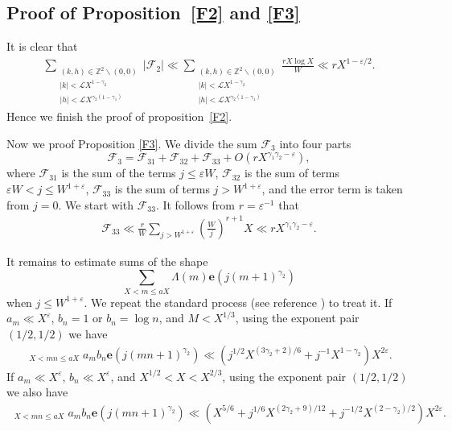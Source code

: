 \documentclass[12pt, reqno, twoside, letterpaper]{amsart}
\numberwithin{equation}{section}
\newcommand{\cF}{\ensuremath{\mathcal{F}}}
\newcommand{\cL}{\ensuremath{\mathcal{L}}}
\newcommand{\ZZ}{\ensuremath{\mathbb{Z}}}
\theoremstyle{customthm}
\theoremstyle{customrem}
\begin{document}
\subsection{Proof of Proposition~\ref{F2} and \ref{F3}}

It is clear that
\begin{align}\label{eq: bound for F2}
	\sum_{\substack{(k,h) \in \ZZ^2 \backslash (0,0) \\ |k|<\cL X^{1-\gamma_2} \\ |h|<\cL X^{\gamma_2(1-\gamma_1)}}}|\cF_2|
	\ll \sum_{\substack{(k,h) \in \ZZ^2 \backslash (0,0) \\ |k|<\cL X^{1-\gamma_2} \\ |h|<\cL X^{\gamma_2(1-\gamma_1)}}}\frac{rX\log X}{W}\ll rX^{1-\varepsilon/2}.
\end{align}
Hence we finish the proof of proposition~\ref{F2}.

Now we proof Proposition \ref{F3}. We divide the sum $\cF_3$ into four parts
$$
\cF_3=\cF_{31}+\cF_{32}+\cF_{33}+O\left(rX^{\gamma_1\gamma_2-\varepsilon}\right),
$$
where $\cF_{31}$ is the sum of the terms $j\leqslant \varepsilon W$, $\cF_{32}$
is the sum of terms $\varepsilon W<j\leqslant W^{1+\varepsilon}$, $\cF_{33}$ is the
sum of terms $j>W^{1+\varepsilon}$, and the error term is taken from $j=0$. We start with
$\cF_{33}$. It follows from $r=\varepsilon^{-1}$ that
\begin{align*}
\cF_{33}\ll \frac{r}{W}\sum_{j>W^{1+\varepsilon}}\left(\frac{W}{j}\right)^{r+1}X
\ll r X^{\gamma_1\gamma_2-\varepsilon}.
\end{align*}

It remains to estimate sums of the shape
$$
\sum_{X < m \leqslant aX}\Lambda(m)\mathbf{e}\left(j(m+1)^{\gamma_2}\right)
$$
when $j\leqslant W^{1+\varepsilon}$.
We repeat the standard process (see reference \cite[P.46-52]{GrahamK1991}) to treat it.
If $a_m\ll X^{\varepsilon}$, $b_n=1$ or $b_n=\log n$, and $M<X^{1/3}$,
using the exponent pair $(1/2,1/2)$ we have
\begin{align*}
\mathop{\sum_{m\sim M}\sum_{n\sim N}
}_{X < mn \leqslant aX}a_mb_n\mathbf{e}\left(j(mn+1)^{\gamma_2}\right)
\ll \left(j^{1/2}X^{(3\gamma_2+2)/6}+j^{-1}X^{1-\gamma_2}\right)X^{2\varepsilon}.
\end{align*}
If $a_m\ll X^{\varepsilon}$, $b_n\ll X^{\varepsilon}$, and $X^{1/2}<X<X^{2/3}$,
using the exponent pair $(1/2,1/2)$ we also have
\begin{align*}
\mathop{\sum_{m\sim M}\sum_{n\sim N}
}_{X < mn \leqslant aX}a_mb_n\mathbf{e}\left(j(mn+1)^{\gamma_2}\right)
\ll \left(X^{5/6}+j^{1/6}X^{(2\gamma_2+9)/12}
+j^{-1/2}X^{(2-\gamma_2)/2}\right)X^{2\varepsilon}.
\end{align*}
\end{document}

